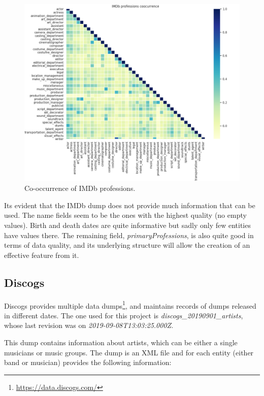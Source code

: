 \documentclass[epsfig,a4paper,11pt,titlepage,twoside,openany]{book}
\newcommand{\footurl}[1]{\footnote{\url{#1}}}
\begin{document}
\begin{figure}[H]
  \centering \includegraphics[width=\textwidth]{imdb_profession_coorcurrence}
  \caption{Co-occurrence of IMDb professions.}
  \label{fig:imdb-profession-coocurrence-heatmap}
\end{figure}

Its evident that the IMDb dump does not provide much information that can be used. The name fields seem to be the ones with the highest quality (no empty values). Birth and death dates are quite informative but sadly only few entities have values there. The remaining field, \textit{primaryProfessions}, is also quite good in terms of data quality, and its underlying structure will allow the creation of an effective feature from it.



\subsection{Discogs}
\label{sec:shape-discogs}

Discogs provides multiple data dumps\footurl{https://data.discogs.com/}, and maintains records of dumps released in different dates. The one used for this project is \textit{discogs\_20190901\_artists}, whose last revision was on \textit{2019-09-08T13:03:25.000Z}.

This dump contains information about artists, which can be either a single musicians or music groups. The dump is an XML file and for each entity (either band or musician) provides the following information:
\end{document}
